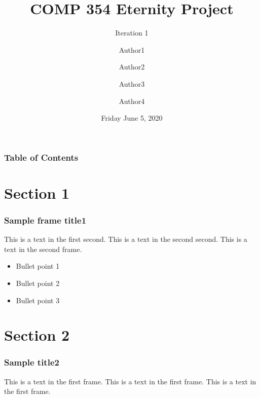 \documentclass{beamer}
\title{COMP 354 Eternity Project}
\subtitle{Iteration 1}
\author
{Author1\inst{1} 
\and Author2\inst{2} 
\and Author3\inst{3} 
\and Author4\inst{4}
}
\institute
{
    \inst{1}
    ID ....\\
    \inst{2}
    ID ....\\
    \inst{3}
    ID ....\\
    \inst{4}
    ID ....\\
}
\institute{Concordia University}
\date{Friday June 5, 2020}
\begin{document}
\frame{\titlepage}

\begin{frame}
\frametitle{Table of Contents}
\tableofcontents
\end{frame}

\section{Section 1}
\begin{frame}
\frametitle{Sample frame title1}
This is a text in the first second. This is a text in the second second. This is a text in the second frame.
\begin{itemize}
 \item Bullet point 1
 \item Bullet point 2
 \item Bullet point 3
\end{itemize}
\end{frame}




\section{Section 2}
\begin{frame}
\frametitle{Sample title2}
This is a text in the first frame. This is a text in the first frame. This is a text in the first frame.
\end{frame}
\end{document}

